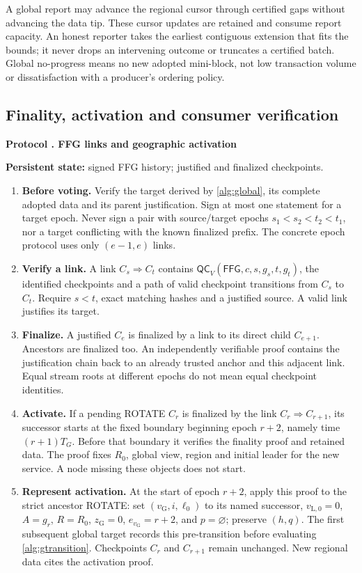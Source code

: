 \documentclass[11pt,a4paper,onecolumn]{article}
\newcommand{\QC}{\mathsf{QC}}
\newcommand{\gv}{v_{\mathrm G}}
\newcommand{\Tag}[1]{\mathsf{#1}}
\theoremstyle{remark}\newtheorem{example}[definition]{Example}
\newcounter{protocol}
\newenvironment{protocol}[2]{\refstepcounter{protocol}\label{#1}\begin{mdframed}[nobreak=true,linewidth=.6pt,skipabove=10pt,skipbelow=10pt,innertopmargin=8pt,innerbottommargin=8pt]\small\raggedright\noindent\textbf{Protocol \theprotocol. #2}\par\smallskip}{\end{mdframed}}
\begin{document}
A global report may advance the regional cursor through certified gaps without
advancing the data tip. These cursor updates are retained and consume report
capacity. An honest reporter takes the earliest contiguous extension that fits
the bounds; it never drops an intervening outcome or truncates a certified batch.
Global no-progress means no new adopted mini-block, not low transaction volume
or dissatisfaction with a producer's ordering policy.

\subsection{Finality, activation and consumer verification}\label{sec:finality}
\begin{protocol}{alg:finality}{FFG links and geographic activation}
\textbf{Persistent state:} signed FFG history; justified and finalized checkpoints.
\begin{enumerate}[label=\textbf{F\arabic*.}]
\item \textbf{Before voting.} Verify the target derived by \cref{alg:global},
its complete adopted data and its parent justification. Sign at most one
statement for a target epoch. Never sign a pair with source/target epochs
$s_1<s_2<t_2<t_1$, nor a target conflicting with the known finalized prefix.
The concrete epoch protocol uses only $(e-1,e)$ links.
\item \textbf{Verify a link.} A link $C_s\Rightarrow C_t$ contains
$\QC_V(\Tag{FFG},c,s,g_s,t,g_t)$, the identified checkpoints and a path of
valid checkpoint transitions from $C_s$ to $C_t$. Require $s<t$, exact matching
hashes and a justified source.
A valid link justifies its target.
\item \textbf{Finalize.} A justified $C_e$ is finalized by a link to its direct
child $C_{e+1}$. Ancestors are finalized too. An independently verifiable proof
contains the justification chain back to an already trusted anchor and this
adjacent link. Equal stream roots at different epochs do not mean equal
checkpoint identities.
\item \textbf{Activate.} If a pending ROTATE $C_r$ is finalized by the link
$C_r\Rightarrow C_{r+1}$, its successor starts at the fixed boundary beginning
epoch $r+2$, namely time $(r+1)T_G$. Before that boundary it verifies the finality
proof and retained data. The proof fixes $R_0$, global view, region and initial
leader for the new service. A node missing these objects does not start.
\item \textbf{Represent activation.} At the start of epoch $r+2$, apply this
proof to the strict ancestor ROTATE: set $(\gv,i,\ell_0)$ to its named successor,
$v_{\mathrm L,0}=0$, $A=g_r$, $R=R_0$, $z_{\mathrm G}=0$, $e_{\gv}=r+2$, and $p=\varnothing$;
preserve $(h,q)$. The first subsequent global target records this pre-transition
before evaluating \cref{alg:gtransition}. Checkpoints $C_r$ and
$C_{r+1}$ remain unchanged. New regional data cites the activation proof.
\end{enumerate}
\end{protocol}
\end{document}
